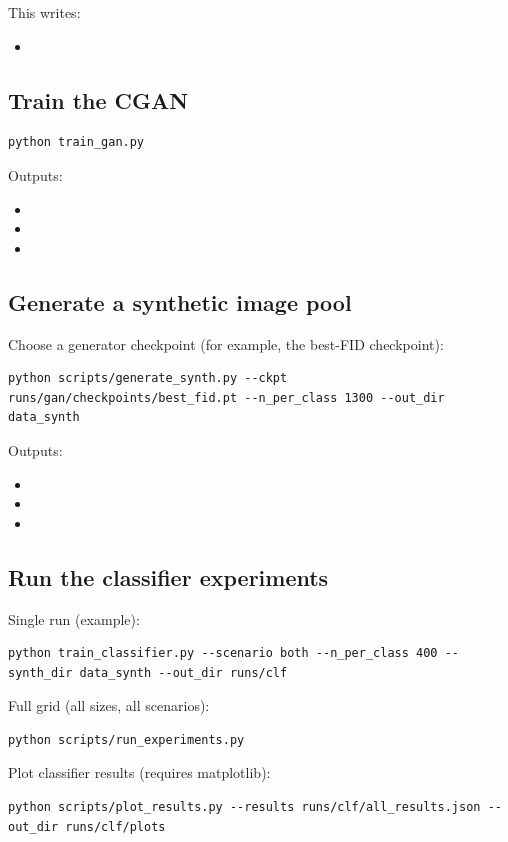 This writes:
\begin{itemize}
\item {}
\end{itemize}

\subsection{Train the CGAN}

\begin{verbatim}
python train_gan.py
\end{verbatim}

Outputs:
\begin{itemize}
\item {}
\item {}
\item {}
\end{itemize}

\subsection{Generate a synthetic image pool}

Choose a generator checkpoint (for example, the best-FID checkpoint):

\begin{verbatim}
python scripts/generate_synth.py --ckpt runs/gan/checkpoints/best_fid.pt --n_per_class 1300 --out_dir data_synth
\end{verbatim}

Outputs:
\begin{itemize}
\item {}
\item {}
\item {}
\end{itemize}

\subsection{Run the classifier experiments}

Single run (example):

\begin{verbatim}
python train_classifier.py --scenario both --n_per_class 400 --synth_dir data_synth --out_dir runs/clf
\end{verbatim}

Full grid (all sizes, all scenarios):

\begin{verbatim}
python scripts/run_experiments.py
\end{verbatim}

Plot classifier results (requires matplotlib):

\begin{verbatim}
python scripts/plot_results.py --results runs/clf/all_results.json --out_dir runs/clf/plots
\end{verbatim}
